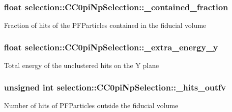 \subsubsection[{\texorpdfstring{\+\_\+contained\+\_\+fraction}{_contained_fraction}}]{\setlength{\rightskip}{0pt plus 5cm}float selection\+::\+C\+C0pi\+Np\+Selection\+::\+\_\+contained\+\_\+fraction\hspace{0.3cm}{\ttfamily [private]}}\hypertarget{classselection_1_1CC0piNpSelection_a8e7933222bce1424aee24bae8dcf4864}{}\label{classselection_1_1CC0piNpSelection_a8e7933222bce1424aee24bae8dcf4864}
Fraction of hits of the P\+F\+Particles contained in the fiducial volume 
\subsubsection[{\texorpdfstring{\+\_\+extra\+\_\+energy\+\_\+y}{_extra_energy_y}}]{\setlength{\rightskip}{0pt plus 5cm}float selection\+::\+C\+C0pi\+Np\+Selection\+::\+\_\+extra\+\_\+energy\+\_\+y\hspace{0.3cm}{\ttfamily [private]}}\hypertarget{classselection_1_1CC0piNpSelection_a2e386c361ecc27d22ff2642e80a629e4}{}\label{classselection_1_1CC0piNpSelection_a2e386c361ecc27d22ff2642e80a629e4}
Total energy of the unclustered hits on the Y plane 
\subsubsection[{\texorpdfstring{\+\_\+hits\+\_\+outfv}{_hits_outfv}}]{\setlength{\rightskip}{0pt plus 5cm}unsigned int selection\+::\+C\+C0pi\+Np\+Selection\+::\+\_\+hits\+\_\+outfv\hspace{0.3cm}{\ttfamily [private]}}\hypertarget{classselection_1_1CC0piNpSelection_ac39ec79d190fb925f8d20b03cbeb0605}{}\label{classselection_1_1CC0piNpSelection_ac39ec79d190fb925f8d20b03cbeb0605}
Number of hits of P\+F\+Particles outside the fiducial volume 
